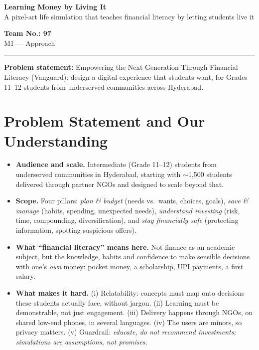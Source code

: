 \documentclass[10pt,a4paper]{article}
\begin{document}
\begin{minipage}[t]{0.70\textwidth}
{\LARGE\bfseries Learning Money by Living It}\\[1pt]
{\color{muted}A pixel-art life simulation that teaches financial literacy by letting students live it}
\end{minipage}\hfill
\begin{minipage}[t]{0.28\textwidth}\raggedleft
{\bfseries Team No.: 97}\\[1pt]
{\small\color{muted}M1 --- Approach}
\end{minipage}

\vspace{3pt}
{\color{acc}\rule{\textwidth}{1.2pt}}
\vspace{-2pt}

{\small\textbf{Problem statement:} Empowering the Next Generation Through Financial Literacy (Vanguard): design a digital experience that students want, for Grades 11--12 students from underserved communities across Hyderabad.}

\section{Problem Statement and Our Understanding}
\begin{itemize}
  \item \textbf{Audience and scale.} Intermediate (Grade 11--12) students from underserved communities in Hyderabad, starting with $\sim$1,500 students delivered through partner NGOs and designed to scale beyond that.
  \item \textbf{Scope.} Four pillars: \emph{plan \& budget} (needs vs.\ wants, choices, goals), \emph{save \& manage} (habits, spending, unexpected needs), \emph{understand investing} (risk, time, compounding, diversification), and \emph{stay financially safe} (protecting information, spotting suspicious offers).
  \item \textbf{What ``financial literacy'' means here.} Not finance as an academic subject, but the knowledge, habits and confidence to make sensible decisions with one's \emph{own} money: pocket money, a scholarship, UPI payments, a first salary.
  \item \textbf{What makes it hard.} (i) Relatability: concepts must map onto decisions these students actually face, without jargon. (ii) Learning must be demonstrable, not just engagement. (iii) Delivery happens through NGOs, on shared low-end phones, in several languages. (iv) The users are minors, so privacy matters. (v) Guardrail: \emph{educate, do not recommend investments; simulations are assumptions, not promises.}
\end{itemize}
\end{document}
